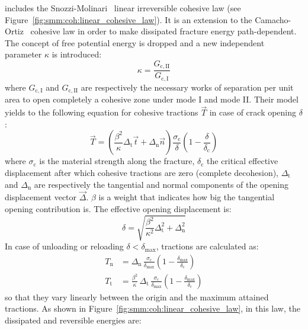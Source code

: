 \akantu includes the Snozzi-Molinari~\cite{snozzi_cohesive_2013}
linear irreversible cohesive law (see
Figure~\ref{fig:smm:coh:linear_cohesive_law}). It is an extension to
the Camacho-Ortiz~\cite{camacho_computational_1996} cohesive law in
order to make dissipated fracture energy path-dependent. The concept
of free potential energy is dropped and a new independent parameter
$\kappa$ is introduced:
\begin{equation}
  \kappa = \frac{G_\mathrm{c, II}}{G_\mathrm{c, I}}
\end{equation}
where $G_\mathrm{c, I}$ and $G_\mathrm{c, II}$ are respectively the
necessary works of separation per unit area to open completely a
cohesive zone under mode I and mode II. Their model yields to the
following equation for cohesive tractions $\vec{T}$ in case of crack
opening ${\delta}$:
\begin{equation}
  \label{eq:smm:coh:tractions}
  \vec{T} = \left( \frac{\beta^2}{\kappa} \Delta_\mathrm{t} \vec{t} +
    \Delta_\mathrm{n} \vec{n} \right)
  \frac{\sigma_\mathrm{c}}{\delta}
  \left( 1- \frac{\delta}{\delta_\mathrm{c}} \right)
\end{equation}
where $\sigma_\mathrm{c}$ is the material strength along the fracture,
$\delta_\mathrm{c}$ the critical effective displacement after which
cohesive tractions are zero (complete decohesion), $\Delta_\mathrm{t}$
and $\Delta_\mathrm{n}$ are respectively the tangential and normal
components of the opening displacement vector $\vec{\Delta}$. $\beta$
is a weight that indicates how big the tangential opening contribution
is. The effective opening displacement is:
\begin{equation}
  \delta = \sqrt{\frac{\beta^2}{\kappa^2} \Delta_\mathrm{t}^2 +
    \Delta_\mathrm{n}^2}
\end{equation}
In case of unloading or reloading $\delta < \delta_\mathrm{max}$,
tractions are calculated as:
\begin{align}
  T_\mathrm{n} &= \Delta_\mathrm{n}\,
  \frac{\sigma_\mathrm{c}}{\delta_\mathrm{max}}
  \left( 1- \frac{\delta_\mathrm{max}}{\delta_\mathrm{c}} \right) \\
  T_\mathrm{t} &= \frac{\beta^2}{\kappa}\, \Delta_\mathrm{t}\,
  \frac{\sigma_\mathrm{c}}{\delta_\mathrm{max}}
  \left( 1- \frac{\delta_\mathrm{max}}{\delta_\mathrm{c}} \right)
\end{align}
so that they vary linearly between the origin and the maximum attained
tractions. As shown in Figure~\ref{fig:smm:coh:linear_cohesive_law},
in this law, the dissipated and reversible energies are:
